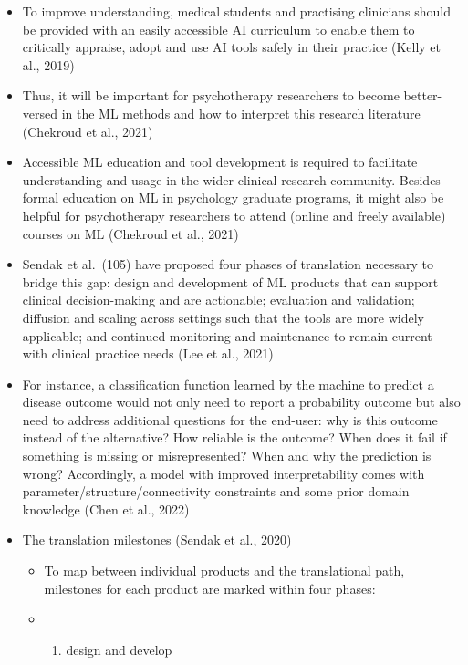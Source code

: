 \documentclass[
  man]{apa7}
\providecommand{\tightlist}{%
  \setlength{\itemsep}{0pt}\setlength{\parskip}{0pt}}
\begin{document}
\begin{itemize}
\tightlist
\item
  To improve understanding, medical students and practising clinicians should be provided with an easily accessible AI curriculum to enable them to critically appraise, adopt and use AI tools safely in their practice (Kelly et al., 2019)
\item
  Thus, it will be important for psychotherapy researchers to become better-versed in the ML methods and how to interpret this research literature (Chekroud et al., 2021)
\item
  Accessible ML education and tool development is required to facilitate understanding and usage in the wider clinical research community. Besides formal education on ML in psychology graduate programs, it might also be helpful for psychotherapy researchers to attend (online and freely available) courses on ML (Chekroud et al., 2021)
\item
  Sendak et al.~(105) have proposed four phases of translation necessary to bridge this gap: design and development of ML products that can support clinical decision-making and are actionable; evaluation and validation; diffusion and scaling across settings such that the tools are more widely applicable; and continued monitoring and maintenance to remain current with clinical practice needs (Lee et al., 2021)
\item
  For instance, a classification function learned by the machine to predict a disease outcome would not only need to report a probability outcome but also need to address additional questions for the end-user: why is this outcome instead of the alternative? How reliable is the outcome? When does it fail if something is missing or misrepresented? When and why the prediction is wrong? Accordingly, a model with improved interpretability comes with parameter/structure/connectivity constraints and some prior domain knowledge (Chen et al., 2022)
\item
  The translation milestones (Sendak et al., 2020)

  \begin{itemize}
  \item
    To map between individual products and the translational path, milestones for each product are marked within four phases:
  \item
    \begin{enumerate}
    \def\labelenumi{\arabic{enumi})}
    \tightlist
    \item
      design and develop
    \end{enumerate}


\end{itemize}
\end{itemize}
\end{document}
